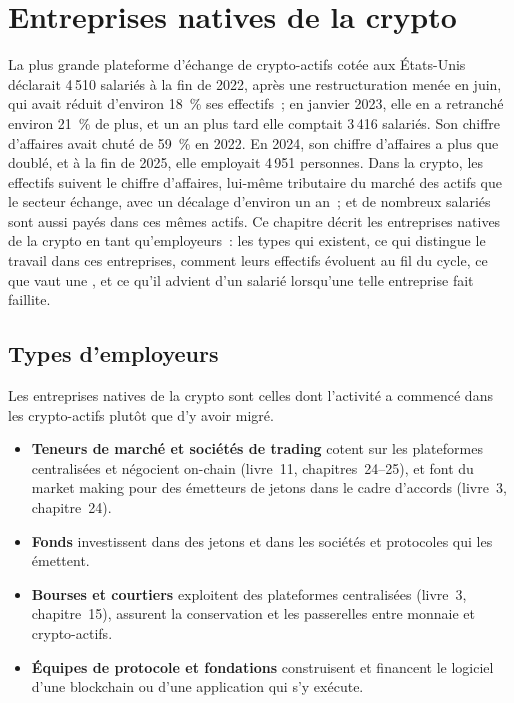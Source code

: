 \chapter{Entreprises natives de la crypto}\label{ch:in:crypto-native-firms}

La plus grande plateforme d'échange de crypto-actifs cotée aux États-Unis déclarait 4\,510 salariés à la fin de 2022, après une restructuration menée en juin, qui
avait réduit d'environ 18~\% ses effectifs~; en janvier 2023, elle en a retranché environ 21~\% de plus, et un an plus tard elle comptait 3\,416 salariés. Son chiffre d'affaires avait
chuté de 59~\% en 2022. En 2024, son chiffre d'affaires a plus que doublé, et à la fin de 2025, elle employait 4\,951 personnes. Dans la crypto,
les effectifs suivent le chiffre d'affaires, lui-même tributaire du marché des actifs que le secteur échange, avec un décalage d'environ un an~;
et de nombreux salariés sont aussi payés dans ces mêmes actifs. Ce chapitre décrit les entreprises natives de la crypto en tant qu'employeurs~: les types qui existent, ce qui distingue le travail dans ces entreprises,
comment leurs effectifs évoluent au fil du cycle, ce que vaut une , et ce qu'il advient d'un salarié
lorsqu'une telle entreprise fait faillite.

\section{Types d'employeurs}

Les entreprises natives de la crypto sont celles dont l'activité a commencé dans les crypto-actifs plutôt que d'y avoir migré.
\begin{itemize}
\item \textbf{Teneurs de marché et sociétés de trading} cotent sur les plateformes centralisées et négocient on-chain (livre~11,
chapitres~24--25), et font du market making pour des émetteurs de jetons dans le cadre d'accords (livre~3, chapitre~24).
\item \textbf{Fonds} investissent dans des jetons et dans les sociétés et protocoles qui les émettent.
\item \textbf{Bourses et courtiers} exploitent des plateformes centralisées (livre~3, chapitre~15), assurent la conservation et les passerelles entre monnaie et
crypto-actifs.
\item \textbf{Équipes de protocole et fondations} construisent et financent le logiciel d'une blockchain ou d'une application qui s'y exécute.
\end{itemize}

